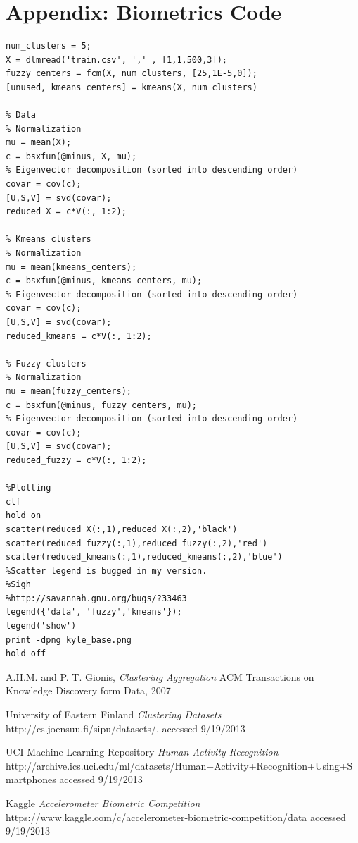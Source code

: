 \documentclass{article}
\begin{document}
\section*{Appendix: Biometrics Code}
\begin{lstlisting}
num_clusters = 5;
X = dlmread('train.csv', ',' , [1,1,500,3]);
fuzzy_centers = fcm(X, num_clusters, [25,1E-5,0]);
[unused, kmeans_centers] = kmeans(X, num_clusters)

% Data
% Normalization
mu = mean(X);
c = bsxfun(@minus, X, mu);
% Eigenvector decomposition (sorted into descending order)
covar = cov(c);
[U,S,V] = svd(covar);
reduced_X = c*V(:, 1:2);

% Kmeans clusters
% Normalization
mu = mean(kmeans_centers);
c = bsxfun(@minus, kmeans_centers, mu);
% Eigenvector decomposition (sorted into descending order)
covar = cov(c);
[U,S,V] = svd(covar);
reduced_kmeans = c*V(:, 1:2);

% Fuzzy clusters
% Normalization
mu = mean(fuzzy_centers);
c = bsxfun(@minus, fuzzy_centers, mu);
% Eigenvector decomposition (sorted into descending order)
covar = cov(c);
[U,S,V] = svd(covar);
reduced_fuzzy = c*V(:, 1:2);

%Plotting
clf
hold on
scatter(reduced_X(:,1),reduced_X(:,2),'black')
scatter(reduced_fuzzy(:,1),reduced_fuzzy(:,2),'red')
scatter(reduced_kmeans(:,1),reduced_kmeans(:,2),'blue')
%Scatter legend is bugged in my version.
%Sigh
%http://savannah.gnu.org/bugs/?33463
legend({'data', 'fuzzy','kmeans'});
legend('show')
print -dpng kyle_base.png
hold off    
\end{lstlisting}
\begin{thebibliography}{9}

  A.H.M. and P. T. Gionis, 
  \emph{Clustering Aggregation}
  ACM Transactions on Knowledge Discovery form Data, 
  2007 

  University of Eastern Finland
  \emph{Clustering Datasets}
  http://cs.joensuu.fi/sipu/datasets/,
  accessed 9/19/2013

  UCI Machine Learning Repository
  \emph{Human Activity Recognition}
  http://archive.ics.uci.edu/ml/datasets/Human+Activity+Recognition+Using+Smartphones
  accessed 9/19/2013

  Kaggle 
  \emph{Accelerometer Biometric Competition}
  https://www.kaggle.com/c/accelerometer-biometric-competition/data
  accessed 9/19/2013

\end{thebibliography}
\end{document}

